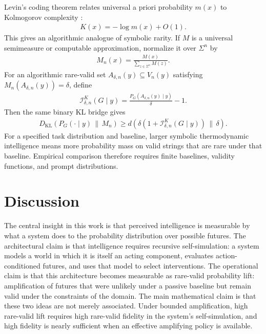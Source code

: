 \documentclass[
  aps,
  prresearch,
  reprint,
  amsmath,
  amssymb,
  superscriptaddress,
  nofootinbib,
  longbibliography
]{revtex4-2}
\def\EQSP{3pt}
\newcommand{\cgather}[2][\EQSP]{\begingroup\setlength\abovedisplayskip{#1}\setlength\belowdisplayskip{#1}\begin{gather} #2 \end{gather}\endgroup\noindent}
\newcommand{\calI}{\mathcal{I}}
\begin{document}
Levin's coding theorem relates universal a priori probability \(m(x)\) to Kolmogorov complexity \citep{levin1974laws}:
\cgather{
    K(x)=-\log m(x)+O(1).
    \label{eq:levin_coding}
}
This gives an algorithmic analogue of symbolic rarity. If \(M\) is a universal semimeasure or computable approximation, normalize it over \(\Sigma^n\) by
\cgather{
    M_n(x)=\frac{M(x)}{\sum_{z\in\Sigma^n}M(z)}.
}
For an algorithmic rare-valid set \(A_{\delta,n}(y)\subseteq V_n(y)\) satisfying \(M_n(A_{\delta,n}(y))=\delta\), define
\cgather{
    \calI_{\delta,n}^{K}(G\mid y)
    =
    \frac{P_G(A_{\delta,n}(y)\mid y)}{\delta}-1.
    \label{eq:algorithmic_I}
}
Then the same binary KL bridge gives
\cgather{
    D_{\mathrm{KL}}\!\left(P_G(\cdot\mid y)\,\|\,M_n\right)
    \geq
    d\!\left(\delta(1+\calI_{\delta,n}^{K}(G\mid y))\,\|\,\delta\right).
    \label{eq:algorithmic_kl_bridge}
}
For a specified task distribution and baseline, larger symbolic thermodynamic intelligence means more probability mass on valid strings that are rare under that baseline. Empirical comparison therefore requires finite baselines, validity functions, and prompt distributions.


\section{Discussion}
\label{sec:discussion}
The central insight in this work is that perceived intelligence is measurable by what a system does to the probability distribution over possible futures. The architectural claim is that intelligence requires recursive self-simulation: a system models a world in which it is itself an acting component, evaluates action-conditioned futures, and uses that model to select interventions. The operational claim is that this architecture becomes measurable as rare-valid probability lift: amplification of futures that were unlikely under a passive baseline but remain valid under the constraints of the domain. The main mathematical claim is that these two ideas are not merely associated. Under bounded amplification, high rare-valid lift requires high rare-valid fidelity in the system's self-simulation, and high fidelity is nearly sufficient when an effective amplifying policy is available.
\end{document}
